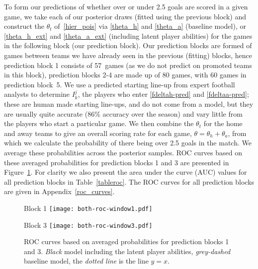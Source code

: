 \documentclass[11pt,a4paper]{article}
\begin{document}
To form our predictions of whether over or under 2.5 goals are scored 
in a given game, we take each of our posterior draws (fitted using 
the previous block) and construct the $\theta_t$ of~\eqref{hier_pois} 
via \eqref{theta_h} and \eqref{theta_a} (baseline model), or 
\eqref{theta_h_ext} and \eqref{theta_a_ext} (including latent player 
abilities) for the games in the following block (our prediction 
block). Our prediction blocks are formed of games between teams we 
have already seen in the previous (fitting) blocks, hence prediction 
block 1 consists of 57~games (as we do not predict on promoted teams in 
this block), prediction blocks 2-4 are made up of 
80 games, with 60 games in prediction block~5. We use a 
predicted starting line-up from expert football analysts to determine $I_k^j$, 
the players who enter \eqref{fdeltah-pred} and \eqref{fdeltaa-pred}; 
these are human made starting line-ups, and do not come from a model, 
but they are usually quite accurate (86\% accuracy over the season) and 
vary little from the players who 
start a particular game. We then combine the $\theta_t$ for the home 
and away teams to give an overall scoring rate for each game, 
$\theta = \theta_h + \theta_a$, 
from which we calculate the probability of there being over 2.5 goals in 
the match. We average these probabilities across the posterior samples. 
ROC curves based on these averaged probabilities for prediction 
blocks 1 and 3 are presented in Figure~\ref{rocfig}. For clarity we also 
present the area under the curve (AUC) values for all prediction 
blocks in Table~\ref{tableroc}. The ROC curves for all prediction blocks 
are given in Appendix~\ref{roc_curves}.



\begin{figure}%
\hspace{-1.2cm}
\begin{minipage}[b]{0.48\linewidth}
        \centering
        \qquad\qquad\qquad\quad Block 1\vspace{0.01cm}
        \texttt{[image: both-roc-window1.pdf]}
\end{minipage} 
\hspace{0.72cm}
\begin{minipage}[b]{0.48\linewidth}
        \centering
        \qquad\qquad\qquad\quad Block 3\vspace{0.01cm}
        \texttt{[image: both-roc-window3.pdf]}
\end{minipage} 
      \caption{ROC curves based on averaged probabilities for prediction blocks 1 and 3. \emph{Black} model including the latent player abilities, \emph{grey-dashed} baseline model, the \emph{dotted line} is the line $y=x$.} \label{rocfig}
\end{figure} 
\end{document}
